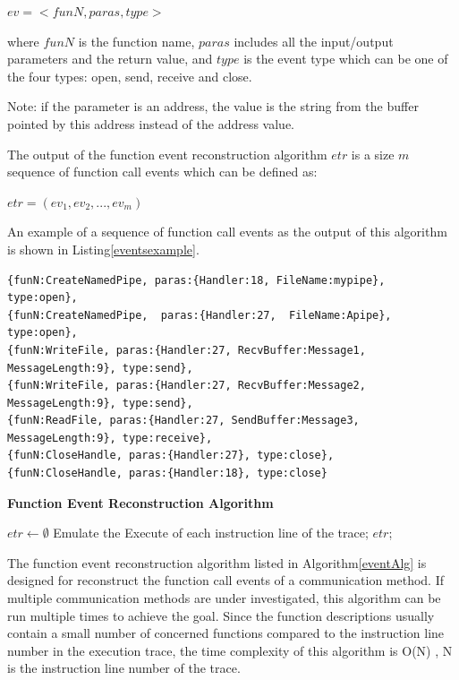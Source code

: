 $ev = <funN, paras, type>$

where $funN$ is the function name, $paras$ includes all the input/output parameters and the return value, and $type$ is the event type which can be one of the four types: open, send, receive and close.

Note: if the parameter is an address, the value is the string from the buffer pointed by this address instead of the address value.

The output of the function event reconstruction algorithm $etr$ is a size $m$ sequence of function call events which can be defined as:

$etr = (ev_1, ev_2, ..., ev_m)$

An example of a sequence of function call events as the output of this algorithm is shown in Listing\ref{eventsexample}.

\begin{lstlisting}[caption= Example of  $etr$, label=eventsexample]
{funN:CreateNamedPipe, paras:{Handler:18, FileName:mypipe}, type:open},
{funN:CreateNamedPipe,  paras:{Handler:27,  FileName:Apipe}, type:open},
{funN:WriteFile, paras:{Handler:27, RecvBuffer:Message1, MessageLength:9}, type:send},
{funN:WriteFile, paras:{Handler:27, RecvBuffer:Message2, MessageLength:9}, type:send},
{funN:ReadFile, paras:{Handler:27, SendBuffer:Message3, MessageLength:9}, type:receive},
{funN:CloseHandle, paras:{Handler:27}, type:close},
{funN:CloseHandle, paras:{Handler:18}, type:close}
\end{lstlisting}

\begin{algorithm}[H]
\DontPrintSemicolon
\caption{{\bf Function Event Reconstruction Algorithm} \label{eventAlg}}
$etr \leftarrow \emptyset$\; 
Emulate the Execute of each instruction line of the trace;\;
\KwRet $etr$;\;
\end{algorithm} 

The function event reconstruction algorithm listed in Algorithm\ref{eventAlg} is designed for reconstruct the function call events of a communication method. If multiple communication methods are under investigated, this algorithm can be run multiple times to achieve the goal. Since the function descriptions usually contain a  small number of concerned functions compared to the instruction line number in the execution trace, the time complexity of this algorithm is O(N) , N is the instruction line number of the trace.




